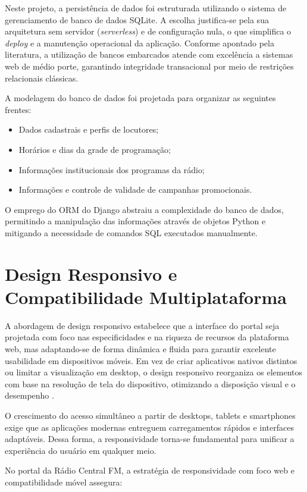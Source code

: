 \documentclass[12pt, openright, oneside, a4paper, brazil]{ads-unipac-abntex2}
\begin{document}
Neste projeto, a persistência de dados foi estruturada utilizando o sistema de gerenciamento de banco de dados SQLite. A escolha justifica-se pela sua arquitetura sem servidor (\textit{serverless}) e de configuração nula, o que simplifica o \textit{deploy} e a manutenção operacional da aplicação. Conforme apontado pela literatura, a utilização de bancos embarcados atende com excelência a sistemas web de médio porte, garantindo integridade transacional por meio de restrições relacionais clássicas.

A modelagem do banco de dados foi projetada para organizar as seguintes frentes:

\begin{itemize}
    \item Dados cadastrais e perfis de locutores;
    \item Horários e dias da grade de programação;
    \item Informações institucionais dos programas da rádio;
    \item Informações e controle de validade de campanhas promocionais.
\end{itemize}

O emprego do ORM do Django abstraiu a complexidade do banco de dados, permitindo a manipulação das informações através de objetos Python e mitigando a necessidade de comandos SQL executados manualmente.

\section{Design Responsivo e Compatibilidade Multiplataforma}

A abordagem de design responsivo estabelece que a interface do portal seja projetada com foco nas especificidades e na riqueza de recursos da plataforma web, mas adaptando-se de forma dinâmica e fluida para garantir excelente usabilidade em dispositivos móveis. Em vez de criar aplicativos nativos distintos ou limitar a visualização em desktop, o design responsivo reorganiza os elementos com base na resolução de tela do dispositivo, otimizando a disposição visual e o desempenho \cite{wroblewski}.

O crescimento do acesso simultâneo a partir de desktops, tablets e smartphones exige que as aplicações modernas entreguem carregamentos rápidos e interfaces adaptáveis. Dessa forma, a responsividade torna-se fundamental para unificar a experiência do usuário em qualquer meio.

No portal da Rádio Central FM, a estratégia de responsividade com foco web e compatibilidade móvel assegura:
\end{document}
